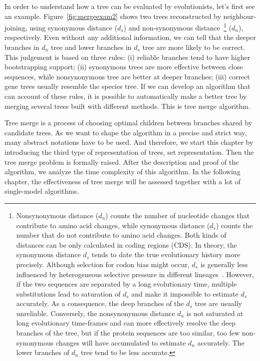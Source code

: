 In order to understand how a tree can be evaluated by evolutionists,
let's first see an example. Figure~\ref{fig:mergeexam2} shows two trees reconstructed by neighbour-joining,
using synonymous distance ($d_s$) and non-synonymous
distance~\cite{nei86,li93,goldman94,yang00}\footnote{Nonsynonymous
distance ($d_n$) counts the number of nucleotide changes that contribute to
amino acid changes, while synonymous distance ($d_s$) counts the number that do not contribute to
amino acid changes.
Both kinds of distances can be only calculated in coding regions (CDS).
In theory, the synonymous distance $d_s$ tends to date the true evolutionary history more
precisely. Although selection for codon bias might occur, $d_s$ is generally less
influenced by heterogeneous selective pressure in different lineages~\cite{ayala99,baldauf03}.
However, if the two sequences are separated by a long evolutionary time, multiple
substitutions lead to saturation of $d_s$ and make it impossible to estimate $d_s$ accurately.
As a consequence, the deep branches of the $d_s$ tree are usually unreliable. Conversely, the
nonsynonymous distance $d_n$ is not saturated at long evolutionary time-frames and can
more effectively resolve the deep branches of the tree, but if the protein sequences are too similar,
too few non-synonymous changes will have accumulated to estimate $d_n$ accurately.
The lower branches of $d_n$ tree tend to be less accurate.} ($d_n$), respectively.
Even without any additional information, we can tell that the deeper branches
in $d_n$ tree and lower branches in $d_s$ tree are more likely to be correct.
This judgement is based on three rules: (i) reliable branches tend to
have higher bootstrapping support; (ii) synonymous trees are more effective
between close sequences, while nonsynonymous tree are better at deeper branches;
(iii) correct gene trees usually resemble the species tree.
If we can develop an algorithm that can account of these rules, it is possible
to automatically make a better tree by merging several trees built with different
methods. This is tree merge algorithm.

Tree merge is a process of choosing optimal
children between branches shared by candidate trees. As we want to shape the
algorithm in a precise and strict way, many abstract notations have to be used.
And therefore, we start this chapter by introducing the third type of representation of trees,
set representation. Then the tree merge problem is formally raised. After the description
and proof of the algorithm, we analyze the time complexity of this algorithm.
In the following chapter, the effectiveness of tree merge will be assessed together
with a lot of single-model algorithms.

